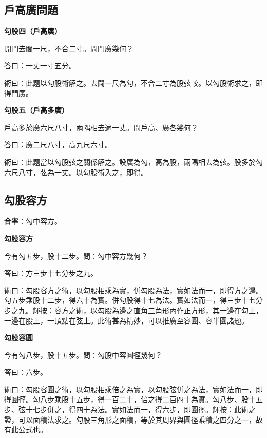 \documentclass[11pt,a4paper]{article}
\newenvironment{problemenv}[1]{%
  \medskip\noindent\textbf{#1}\par\nopagebreak\smallskip
}{\medskip}
\begin{document}
\subsection{戶高廣問題}

\begin{problemenv}{勾股四（戶高廣）}
開門去閫一尺，不合二寸。問門廣幾何？

\textsf{答曰：}一丈一寸五分。

\textsf{術曰：}此題以勾股術解之。去閫一尺為勾，不合二寸為股弦較。以勾股術求之，即得門廣。
\end{problemenv}

\begin{problemenv}{勾股五（戶高多廣）}
戶高多於廣六尺八寸，兩隅相去適一丈。問戶高、廣各幾何？

\textsf{答曰：}廣二尺八寸，高九尺六寸。

\textsf{術曰：}此題當以勾股弦之關係解之。設廣為勾，高為股，兩隅相去為弦。股多於勾六尺八寸，弦為一丈。以勾股術入之，即得。
\end{problemenv}

\subsection{勾股容方}

\textbf{合率}：勾中容方。

\begin{problemenv}{勾股容方}
今有勾五步，股十二步。問：勾中容方幾何？

\textsf{答曰：}方三步十七分步之九。

\textsf{術曰：}勾股容方之術，以勾股相乘為實，併勾股為法，實如法而一，即得方之邊。勾五步乘股十二步，得六十為實。併勾股得十七為法。實如法而一，得三步十七分步之九。輝按：容方之術，以勾股為邊之直角三角形內作正方形，其一邊在勾上，一邊在股上，一頂點在弦上。此術甚為精妙，可以推廣至容圓、容半圓諸題。
\end{problemenv}

\begin{problemenv}{勾股容圓}
今有勾八步，股十五步。問：勾股中容圓徑幾何？

\textsf{答曰：}六步。

\textsf{術曰：}勾股容圓之術，以勾股相乘倍之為實，以勾股弦併之為法，實如法而一，即得圓徑。勾八步乘股十五步，得一百二十，倍之得二百四十為實。勾八步、股十五步、弦十七步併之，得四十為法。實如法而一，得六步，即圓徑。輝按：此術之證，可以面積法求之。勾股三角形之面積，等於其周界與圓徑乘積之四分之一，故有此公式也。
\end{problemenv}
\end{document}
